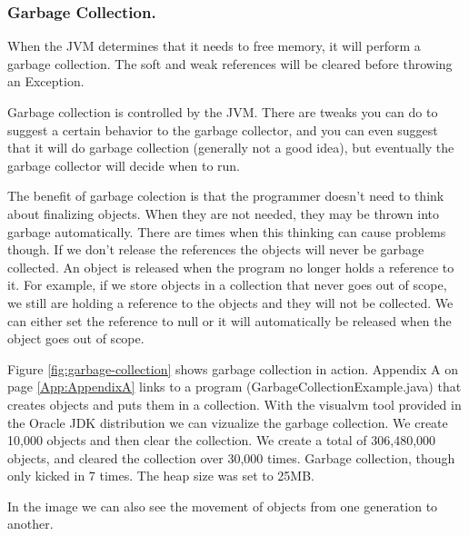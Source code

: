 \subsubsection{Garbage Collection.}
When the JVM determines that it needs to free memory, it will perform a garbage collection. The soft and weak references will be cleared before throwing an Exception. 

Garbage collection is controlled by the JVM. There are tweaks you can do to suggest a certain behavior to the garbage collector, and you can even suggest that it will do garbage collection (generally not a good idea), but eventually the garbage collector will decide when to run.

The benefit of garbage colection is that the programmer doesn't need to think about finalizing objects. When they are not needed, they may be thrown into garbage automatically. There are times when this thinking can cause problems though. If we don't release the references the objects will never be garbage collected. An object is released when the program no longer holds a reference to it. For example, if we store objects in a collection that never goes out of scope, we still are holding a reference to the objects and they will not be collected. We can either set the reference to null or it will automatically be released when the object goes out of scope.

Figure \ref{fig:garbage-collection} shows garbage collection in action. Appendix A on page \ref{App:AppendixA} links to a program (GarbageCollectionExample.java) that creates objects and puts them in a collection. With the visualvm tool provided in the Oracle JDK distribution we can vizualize the garbage collection\cite{garbagecollection}. We create 10,000 objects and then clear the collection. We create a total of 306,480,000 objects, and cleared the collection over 30,000 times. Garbage collection, though only kicked in 7 times. The heap size was set to 25MB. 

In the image we can also see the movement of objects from one generation to another.
